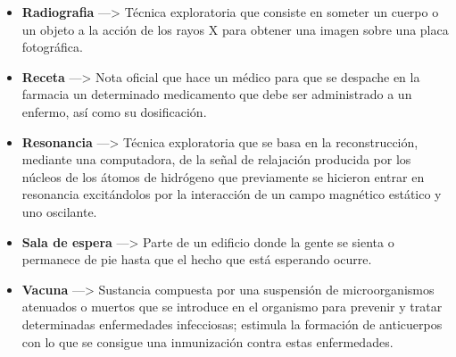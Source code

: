 \documentclass[11pt,a4paper]{article}
\begin{document}
\begin{itemize}
	\item \textbf{Radiografia} ---> Técnica exploratoria que consiste en someter un cuerpo o un objeto a la acción de los rayos X para obtener una imagen sobre una placa fotográfica.
	
	\item \textbf{Receta} ---> Nota oficial que hace un médico para que se despache en la farmacia un determinado medicamento que debe ser administrado a un enfermo, así como su dosificación.
	
	\item \textbf{Resonancia} ---> Técnica exploratoria que se basa en la reconstrucción, mediante una computadora, de la señal de relajación producida por los núcleos de los átomos de hidrógeno que previamente se hicieron entrar en resonancia excitándolos por la interacción de un campo magnético estático y uno oscilante.
	
	\item \textbf{Sala de espera} ---> Parte de un edificio donde la gente se sienta o permanece de pie hasta que el hecho que está esperando ocurre.
	
	\item \textbf{Vacuna} ---> Sustancia compuesta por una suspensión de microorganismos atenuados o muertos que se introduce en el organismo para prevenir y tratar determinadas enfermedades infecciosas; estimula la formación de anticuerpos con lo que se consigue una inmunización contra estas enfermedades.
\end{itemize}


	
\end{document}
